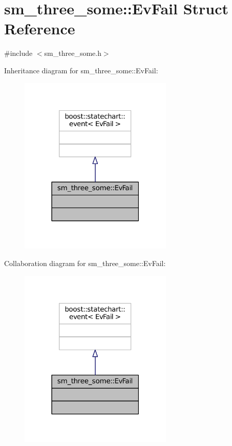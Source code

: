 \hypertarget{structsm__three__some_1_1EvFail}{}\section{sm\+\_\+three\+\_\+some\+:\+:Ev\+Fail Struct Reference}
\label{structsm__three__some_1_1EvFail}


{\ttfamily \#include $<$sm\+\_\+three\+\_\+some.\+h$>$}



Inheritance diagram for sm\+\_\+three\+\_\+some\+:\+:Ev\+Fail\+:
\nopagebreak
\begin{figure}[H]
\begin{center}
\leavevmode
\includegraphics[width=207pt]{structsm__three__some_1_1EvFail__inherit__graph}
\end{center}
\end{figure}


Collaboration diagram for sm\+\_\+three\+\_\+some\+:\+:Ev\+Fail\+:
\nopagebreak
\begin{figure}[H]
\begin{center}
\leavevmode
\includegraphics[width=207pt]{structsm__three__some_1_1EvFail__coll__graph}
\end{center}
\end{figure}


